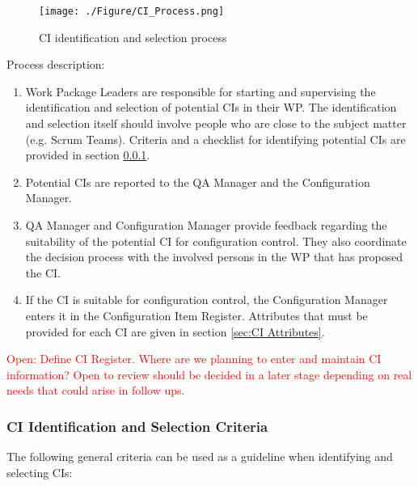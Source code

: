 \documentclass{template/openetcs_report}
\begin{document}
\begin{figure}[H]
\centering
\caption{CI identification and selection process}
\texttt{[image: ./Figure/CI\_Process.png]}
\end{figure}

Process description:

\vspace{-10pt}
\begin{enumerate}
\item Work Package Leaders are responsible for starting and supervising the identification and selection of potential CIs in their WP. The identification and selection itself should involve people who are close to the subject matter (e.g. Scrum Teams). Criteria and a checklist for identifying potential CIs are provided in section \ref{sec:CI Identification and Selection Criteria}.
\item Potential CIs are reported to the QA Manager and the Configuration Manager.
\item QA Manager and Configuration Manager provide feedback regarding the suitability of the potential CI for configuration control. They also coordinate the decision process with the involved persons in the WP that has proposed the CI.
\item If the CI is suitable for configuration control, the Configuration Manager enters it in the Configuration Item Register. Attributes that must be provided for each CI are given in section \ref{sec:CI Attributes}.
\end{enumerate}

\textcolor{red}{Open: Define CI Register. Where are we planning to enter and maintain CI information? Open to review should be decided in a later stage depending on real needs that could arise in follow ups.}


\subsubsection{CI Identification and Selection Criteria} %
\label{sec:CI Identification and Selection Criteria}

The following general criteria can be used as a guideline when identifying and selecting CIs:
\end{document}

